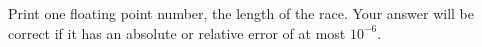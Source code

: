 
Print one floating point number, the length of the race. Your answer will be correct if it has an absolute or relative error of at most $10^{-6}$.

